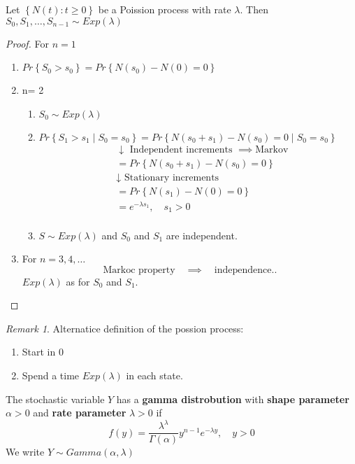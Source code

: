 \documentclass{article}
\theoremstyle{remark}
\newtheorem*{remark}{Remark}
\begin{document}
\begin{theorem}
  Let $\left\{ N\left( t \right): t \ge0 \right\}$ be a Poission process with rate $\lambda $.  Then $S_{0}, S_{1}, \ldots, S_{n-1}\sim Exp\left( \lambda  \right)$
\end{theorem}

\begin{proof}
  For $n = 1$
  \begin{enumerate}[label=(\roman*)]
\item  $\displaystyle  Pr \left \{ S_{0} > s_{0} \right \}  = Pr \left \{   N\left( s_{0} \right) - N\left( 0 \right)    = 0  \right \} $ \[
\] 
\item n= 2
\begin{enumerate}[label=(\alph*)]
  \item $S_{0} \sim Exp\left( \lambda  \right)$ 
  \item $\displaystyle Pr \left \{ S_{1} > s_{1}  \mid  S_{0} = s_{0} \right \}  = Pr \left \{ N\left( s_{0} + s_{1} \right) - N\left( s_{0}  \right) = 0   \mid  S_{0} = s_{0 }\right \} $ \[
      \begin{split}
    &  \downarrow \text{ Independent increments } \implies \text{Markov}  \\
    &= Pr \left \{ N\left( s_{0} +s_{1}  \right) - N\left( s_{0} \right) = 0 \right \}  \\
     &  \downarrow \text{ Stationary increments}  \\
    &= Pr \left \{ N\left( s_{1} \right) - N\left( 0 \right) = 0 \right \}  \\ 
    &=  e^{-\lambda s_{1}} , \quad  s_{1 } > 0  \\
      \end{split} 
  \] 
\item $\displaystyle  S\sim Exp\left( \lambda  \right)$ and $S_{0}$ and $S_{1}$ are independent. 
\end{enumerate}
\item For $n= 3,4 , \ldots$ \[
\text{Markoc property} \quad  \implies  \quad \text{independence.}  .
\] 
$Exp\left( \lambda  \right)$ as for $S_{0}$ and $S_{1}$. 
  \end{enumerate}
\end{proof}
\begin{remark}
  Alternatice definition of the possion process: 
  \begin{enumerate}[label=(\roman*)]
    \item Start in $0$
    \item Spend a time  $Exp\left( \lambda  \right)$ in each state.
  \end{enumerate}
\end{remark}
\newpage
\begin{definition}
  The stochastic variable $Y$ has a \textbf{gamma distrobution }  with \textbf{shape parameter}  $\alpha > 0 $ and \textbf{rate parameter }  $\lambda > 0$ if \[
  f\left( y \right) = \frac{\lambda ^{\lambda }}{\Gamma \left( \alpha  \right)} y^{n-1} e^{-\lambda  y} , \quad  y> 0 
  \] 
  We write $Y \sim Gamma\left( \alpha , \lambda  \right)$
\end{definition}
\end{document}
